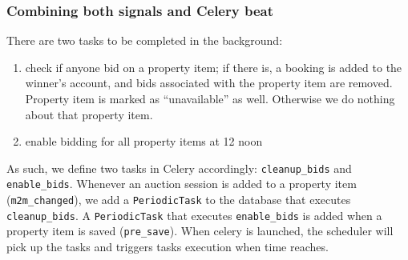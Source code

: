 \subsubsection{Combining both signals and Celery beat}
There are two tasks to be completed in the background:
\begin{enumerate}
  \item check if anyone bid on a property item; if there is, a booking is added
    to the winner's account, and bids associated with the property item are
    removed. Property item is marked as ``unavailable'' as well. Otherwise we do
    nothing about that property item.
  \item enable bidding for all property items at 12 noon
\end{enumerate}
As such, we define two tasks in Celery accordingly: \texttt{cleanup\_bids} and
\texttt{enable\_bids}. Whenever an auction session is added to a property item
(\texttt{m2m\_changed}), we add a \texttt{PeriodicTask} to the database that
executes \texttt{cleanup\_bids}. A \texttt{PeriodicTask} that executes
\texttt{enable\_bids} is added when a property item is
saved (\texttt{pre\_save}). When celery is launched, the scheduler will pick up
the tasks and triggers tasks execution when time reaches.
